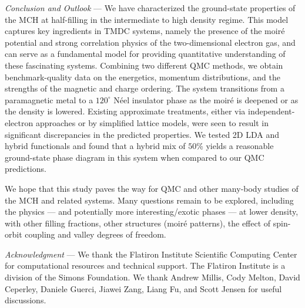 \documentclass[aps,prb,showpacs,preprintnumbers,amsmath,amssymb,superscriptaddress,twocolumn]{revtex4-1}
\newcommand{\ssec}[1]{\emph{#1} ---}
\begin{document}
\ssec{Conclusion and Outlook}
We
have characterized the ground-state properties of the MCH
at half-filling in the intermediate to high density regime.
This model captures key ingredients in TMDC systems, namely the presence
of the moir\'e potential and
strong correlation physics of the two-dimensional electron gas,
and
can serve as a fundamental model for providing quantitative understanding of these fascinating systems.
Combining two different QMC methods, we obtain benchmark-quality data on the energetics,
momentum distributions, and the strengths of the magnetic
and charge ordering. The system transitions from a
paramagnetic metal to
a $120^\circ$ N\'eel insulator phase as the moir\'e is deepened or as the density is lowered.
Existing approximate treatments, either via independent-electron approaches or by
simplified lattice models, were seen to result in significant discrepancies in the predicted properties. We tested 2D LDA and hybrid functionals and found that a
hybrid mix of $50$\%
yields a reasonable ground-state phase diagram
in this system
when compared to our
QMC predictions.

We hope that this study paves the way for QMC and other many-body studies of the MCH and
related systems. Many questions remain to be explored, including the physics ---
and potentially more interesting/exotic phases --- at lower
density, with other filling fractions, other structures (moir\'e patterns),
the effect
of spin-orbit coupling and valley degrees of freedom.

\ssec{Acknowledgment}
We thank the Flatiron Institute Scientific Computing Center for computational resources and technical support. The Flatiron Institute is a division of the Simons Foundation.
We thank Andrew Millis, Cody Melton, David Ceperley, Daniele Guerci, Jiawei Zang, Liang Fu, and Scott Jensen for useful discussions.




\onecolumngrid

\end{document}
